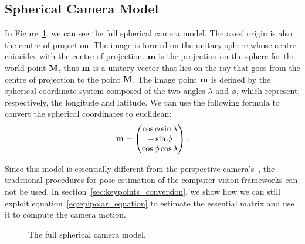 \subsection{Spherical Camera Model}
\label{subsec:spherical_camera_model}
In Figure~\ref{fig:camera_model}, we can see the full spherical camera model.
The axes' origin is also the centre of projection. The image is formed on 
the unitary sphere whose centre coincides with the centre of projection.
$\mathbf{m}$ is the projection on the sphere for the world point 
$\mathbf{M}$, thus $\mathbf{m}$ is a unitary vector that lies on the ray that goes
from the centre of projection to the point $\mathbf{M}$.
The image point $\mathbf{m}$ is defined by the spherical coordinate 
system composed of the two angles $\lambda$ and $\phi$, which represent, respectively, the 
longitude and latitude. 
We can use the following formula to convert the spherical coordinates to 
euclidean:
\begin{equation}
	\label{eq:ll2Cartesian_second}
	\mathbf{m} =
	\begin{pmatrix}
		\cos\phi\sin\lambda \\
		-\sin\phi \\
		\cos\phi\cos\lambda
	\end{pmatrix}	\text{.}
\end{equation}

Since this model is essentially different from the 
perspective camera's~\cite{szeliski2010computer}, the traditional procedures 
for pose estimation of the computer vision frameworks can not be used.
In section~\ref{sec:keypoints_conversion}, we show how we can still exploit
equation~\ref{eq:epipolar_equation} to estimate the essential matrix and use it
to compute the camera motion.

\begin{figure}[h]
    \centering
    \def\svgwidth{0.6\columnwidth}
    
    \caption{The full spherical camera model.}
	\label{fig:camera_model}
\end{figure}

